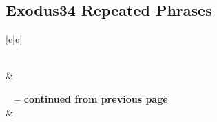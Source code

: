 \subsection{Exodus34 Repeated Phrases}


\normalsize
 
\begin{center}
\begin{longtable}{|c|c|}
\caption[Exodus34 Repeated Phrases]{Exodus34 Repeated Phrases}\label{table:Repeated Phrases Exodus34} \\
\hline {} &  \\ \hline 
\endfirsthead
 
{{\bfseries \tablename\ \thetable{} -- continued from previous page}} \\  
\hline {} &  \\ \hline 
\endhead
 

\end{longtable}
\end{center}
